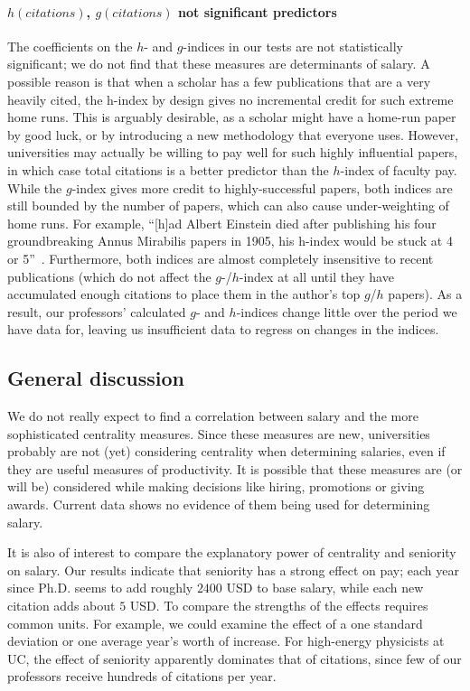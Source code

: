 \paragraph{$h(citations)$, $g(citations)$ not significant predictors}
The coefficients on the $h$- and $g$-indices in our tests are not statistically significant; we do not find that these measures are determinants of salary. A possible reason is that when a scholar has a few publications that are a very heavily cited, the h-index by design gives no incremental credit for such extreme home runs. This is arguably desirable, as a scholar might have a home-run paper by good luck, or by introducing a new methodology that everyone uses. However, universities may actually be willing to pay well for such highly influential papers, in which case total citations is a better predictor than the $h$-index of faculty pay. While the $g$-index gives more credit to highly-successful papers, both indices are still bounded by the number of papers, which can also cause under-weighting of home runs. For example, “[h]ad Albert Einstein died after publishing his four groundbreaking Annus Mirabilis papers in 1905, his h-index would be stuck at 4 or 5”~\cite{wikipediaEinstein}. Furthermore, both indices are almost completely insensitive to recent publications (which do not affect the $g$-/$h$-index at all until they have accumulated enough citations to place them in the author's top $g$/$h$ papers). As a result, our professors' calculated $g$- and $h$-indices change little over the period we have data for, leaving us insufficient data to regress on changes in the indices.

\subsection{General discussion}
We do not really expect to find a correlation between salary and the more sophisticated centrality measures. Since these measures are new, universities probably are not (yet) considering centrality when determining salaries, even if they are useful measures of productivity. It is possible that these measures are (or will be) considered while making decisions like hiring, promotions or giving awards. Current data shows no evidence of them being used for determining salary.

It is also of interest to compare the explanatory power of centrality and seniority on salary. Our results indicate that seniority has a strong effect on pay; each year since Ph.D. seems to add roughly $2400$ USD to base salary, while each new citation adds about $5$ USD. To compare the strengths of the effects requires common units. For example, we could examine the effect of a one standard deviation or one average year’s worth of increase. For high-energy physicists at UC, the effect of seniority apparently dominates that of citations, since few of our professors receive hundreds of citations per year.
